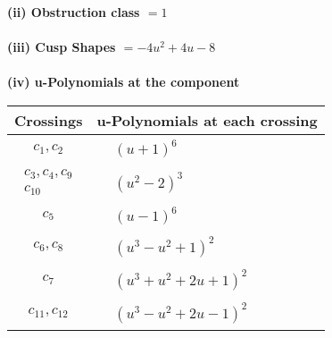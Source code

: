 \documentclass[1p]{elsarticle_modified}
\theoremstyle{definition}
\begin{document}
\flushleft \textbf{(ii) Obstruction class $= 1$}\\~\\
\flushleft \textbf{(iii) Cusp Shapes $= -4 u^2+4 u-8$}\\~\\
\newpage\renewcommand{\arraystretch}{1}
\flushleft \textbf{(iv) u-Polynomials at the component}\newline \\
\begin{tabular}{m{50pt}|m{274pt}}
Crossings & \hspace{64pt}u-Polynomials at each crossing \\
\hline $$\begin{aligned}c_{1},c_{2}\end{aligned}$$&$\begin{aligned}
&(u+1)^6
\end{aligned}$\\
\hline $$\begin{aligned}c_{3},c_{4},c_{9}\\c_{10}\end{aligned}$$&$\begin{aligned}
&(u^2-2)^3
\end{aligned}$\\
\hline $$\begin{aligned}c_{5}\end{aligned}$$&$\begin{aligned}
&(u-1)^6
\end{aligned}$\\
\hline $$\begin{aligned}c_{6},c_{8}\end{aligned}$$&$\begin{aligned}
&(u^3- u^2+1)^2
\end{aligned}$\\
\hline $$\begin{aligned}c_{7}\end{aligned}$$&$\begin{aligned}
&(u^3+u^2+2 u+1)^2
\end{aligned}$\\
\hline $$\begin{aligned}c_{11},c_{12}\end{aligned}$$&$\begin{aligned}
&(u^3- u^2+2 u-1)^2
\end{aligned}$\\
\hline
\end{tabular}\\~\\
\end{document}
